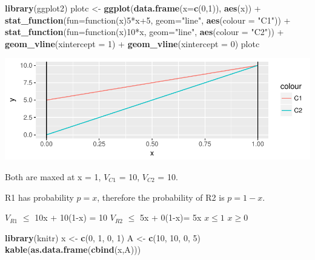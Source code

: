 \documentclass[]{article}
\newenvironment{Shaded}{\begin{snugshade}}{\end{snugshade}}
\newcommand{\KeywordTok}[1]{\textcolor[rgb]{0.13,0.29,0.53}{\textbf{{#1}}}}
\newcommand{\DataTypeTok}[1]{\textcolor[rgb]{0.13,0.29,0.53}{{#1}}}
\newcommand{\DecValTok}[1]{\textcolor[rgb]{0.00,0.00,0.81}{{#1}}}
\newcommand{\StringTok}[1]{\textcolor[rgb]{0.31,0.60,0.02}{{#1}}}
\newcommand{\NormalTok}[1]{{#1}}
\begin{document}
\begin{Shaded}
\begin{Highlighting}[]
\KeywordTok{library}\NormalTok{(ggplot2)}
\NormalTok{plotc <-}\StringTok{ }\KeywordTok{ggplot}\NormalTok{(}\KeywordTok{data.frame}\NormalTok{(}\DataTypeTok{x=}\KeywordTok{c}\NormalTok{(}\DecValTok{0}\NormalTok{,}\DecValTok{1}\NormalTok{)), }\KeywordTok{aes}\NormalTok{(x)) +}
\StringTok{          }\KeywordTok{stat_function}\NormalTok{(}\DataTypeTok{fun=}\NormalTok{function(x)}\DecValTok{5}\NormalTok{*x}\DecValTok{+5}\NormalTok{, }\DataTypeTok{geom=}\StringTok{"line"}\NormalTok{, }\KeywordTok{aes}\NormalTok{(}\DataTypeTok{colour =} \StringTok{"C1"}\NormalTok{)) +}
\StringTok{          }\KeywordTok{stat_function}\NormalTok{(}\DataTypeTok{fun=}\NormalTok{function(x)}\DecValTok{10}\NormalTok{*x, }\DataTypeTok{geom=}\StringTok{"line"}\NormalTok{, }\KeywordTok{aes}\NormalTok{(}\DataTypeTok{colour =} \StringTok{"C2"}\NormalTok{)) +}
\StringTok{            }\KeywordTok{geom_vline}\NormalTok{(}\DataTypeTok{xintercept =} \DecValTok{1}\NormalTok{) +}\StringTok{ }
\StringTok{          }\KeywordTok{geom_vline}\NormalTok{(}\DataTypeTok{xintercept =} \DecValTok{0}\NormalTok{)}
\NormalTok{plotc}
\end{Highlighting}
\end{Shaded}

\includegraphics{Christophe_Hunt_hw9_files/figure-latex/unnamed-chunk-4-1.pdf}

Both are maxed at x = 1, \(V_{C1}\) = 10, \(V_{C2}\) = 10.

\newpage

R1 has probability \(p = x\), therefore the probability of R2 is
\(p=1-x\).

\(V_{R1}\) \(\leq\) 10x + 10(1-x) = 10 \(V_{R2}\) \(\leq\) 5x + 0(1-x)=
5x \(x \leq 1\) \(x \geq 0\)

\begin{Shaded}
\begin{Highlighting}[]
\KeywordTok{library}\NormalTok{(knitr)}
\NormalTok{x <-}\StringTok{ }\KeywordTok{c}\NormalTok{(}\DecValTok{0}\NormalTok{, }\DecValTok{1}\NormalTok{, }\DecValTok{0}\NormalTok{, }\DecValTok{1}\NormalTok{)}
\NormalTok{A <-}\StringTok{ }\KeywordTok{c}\NormalTok{(}\DecValTok{10}\NormalTok{, }\DecValTok{10}\NormalTok{, }\DecValTok{0}\NormalTok{, }\DecValTok{5}\NormalTok{)}
\KeywordTok{kable}\NormalTok{(}\KeywordTok{as.data.frame}\NormalTok{(}\KeywordTok{cbind}\NormalTok{(x,A)))}
\end{Highlighting}
\end{Shaded}
\end{document}
